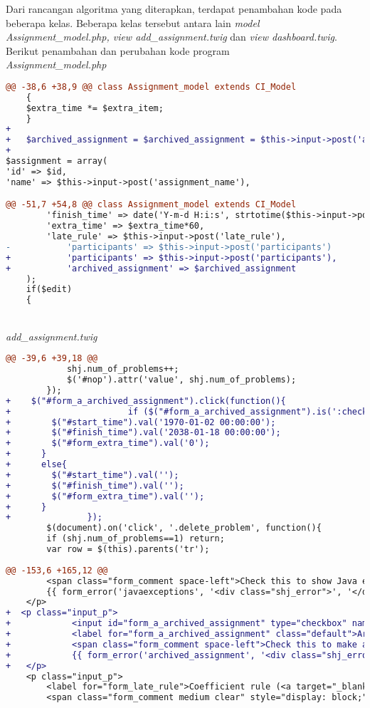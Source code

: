 Dari rancangan algoritma yang diterapkan, terdapat penambahan kode pada beberapa kelas. Beberapa kelas tersebut antara lain \textit{model Assignment\_model.php, view add\_assignment.twig} dan \textit{view dashboard.twig}.
Berikut penambahan dan perubahan kode program
~\\
\textit{Assignment\_model.php}
\begin{lstlisting}[language=diff, basicstyle=\ttfamily, frame=single,
columns=fullflexible, keepspaces=true, breaklines=true]
@@ -38,6 +38,9 @@ class Assignment_model extends CI_Model
	{
	$extra_time *= $extra_item;
	}
+  
+   $archived_assignment = $archived_assignment = $this->input->post('archived_assignment')!==NULL ? 1 : 0;
+  
$assignment = array(
'id' => $id,
'name' => $this->input->post('assignment_name'),

@@ -51,7 +54,8 @@ class Assignment_model extends CI_Model
		'finish_time' => date('Y-m-d H:i:s', strtotime($this->input->post('finish_time'))),
		'extra_time' => $extra_time*60,
		'late_rule' => $this->input->post('late_rule'),
-       	'participants' => $this->input->post('participants')
+           'participants' => $this->input->post('participants'),
+           'archived_assignment' => $archived_assignment
	);
	if($edit)
	{
\end{lstlisting}
~\\
\textit{add\_assignment.twig}
\begin{lstlisting}[language=diff, basicstyle=\ttfamily, frame=single,
columns=fullflexible, keepspaces=true, breaklines=true]
@@ -39,6 +39,18 @@
			shj.num_of_problems++;
			$('#nop').attr('value', shj.num_of_problems);
		});
+    $("#form_a_archived_assignment").click(function(){
+                       if ($("#form_a_archived_assignment").is(':checked')) {
+        $("#start_time").val('1970-01-02 00:00:00');
+        $("#finish_time").val('2038-01-18 00:00:00');
+        $("#form_extra_time").val('0');
+      }
+      else{
+        $("#start_time").val('');
+        $("#finish_time").val('');
+        $("#form_extra_time").val('');
+      }
+               });
		$(document).on('click', '.delete_problem', function(){
		if (shj.num_of_problems==1) return;
		var row = $(this).parents('tr');
		
@@ -153,6 +165,12 @@
		<span class="form_comment space-left">Check this to show Java exceptions to users</span>
		{{ form_error('javaexceptions', '<div class="shj_error">', '</div>') }}
	</p>
+  <p class="input_p">
+            <input id="form_a_archived_assignment" type="checkbox" name="archived_assignment" value="1" {{ edit ? (edit_assignment.archived_assignment ? 'checked') : set_checkbox('archived_assignment', '1')|raw }} />
+            <label for="form_a_archived_assignment" class="default">Archived Assignment</label>
+            <span class="form_comment space-left">Check this to make an archived assignment</span>
+            {{ form_error('archived_assignment', '<div class="shj_error">', '</div>') }}
+   </p>
	<p class="input_p">
		<label for="form_late_rule">Coefficient rule (<a target="_blank" href="https://github.com/mjnaderi/Sharif-Judge/blob/docs/v1.4/add_assignment.md#coefficient-rule">?</a>)</label><br>
		<span class="form_comment medium clear" style="display: block;">PHP script without &lt;?php ?&gt; tags</span>
\end{lstlisting}

